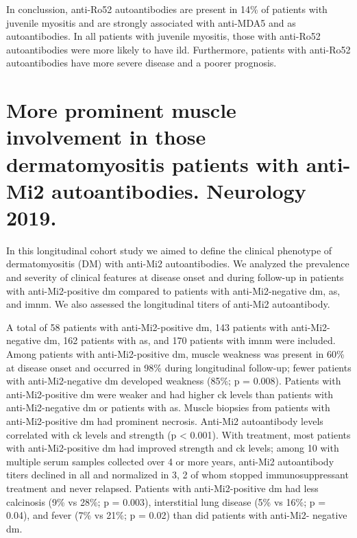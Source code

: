 In conclussion, anti-Ro52 autoantibodies are present in 14\% of patients with juvenile myositis and are strongly associated with anti-MDA5 and \gls{as} autoantibodies. In all patients with juvenile myositis, those with anti-Ro52 autoantibodies were more likely to have \gls{ild}. Furthermore, patients with anti-Ro52 autoantibodies have more severe disease and a poorer prognosis.



\section{More prominent muscle involvement in those dermatomyositis patients with anti-Mi2 autoantibodies. Neurology 2019.}
\label{sec:mi2_clinical}

In this longitudinal cohort study we aimed to define the clinical phenotype of dermatomyositis (DM) with anti-Mi2 autoantibodies. We analyzed the prevalence and severity of clinical features at disease onset and during follow-up in patients with anti-Mi2-positive \gls{dm} compared to patients with anti-Mi2-negative \gls{dm}, \gls{as}, and \gls{imnm}. We also assessed the longitudinal titers of anti-Mi2 autoantibody.

A total of 58 patients with anti-Mi2-positive \gls{dm}, 143 patients with anti-Mi2-negative \gls{dm}, 162 patients with \gls{as}, and 170 patients with \gls{imnm} were included. Among patients with anti-Mi2-positive \gls{dm}, muscle weakness was present in 60\% at disease onset and occurred in 98\% during longitudinal follow-up; fewer patients with anti-Mi2-negative \gls{dm} developed weakness (85\%; p = 0.008). Patients with anti-Mi2-positive \gls{dm} were weaker and had higher \gls{ck} levels than patients with anti-Mi2-negative \gls{dm} or patients with \gls{as}. Muscle biopsies from patients with anti-Mi2-positive \gls{dm} had prominent necrosis. Anti-Mi2 autoantibody levels correlated with \gls{ck} levels and strength (p < 0.001). With treatment, most patients with anti-Mi2-positive \gls{dm} had improved strength and \gls{ck} levels; among 10 with multiple serum samples collected over 4 or more years, anti-Mi2 autoantibody titers declined in all and normalized in 3, 2 of whom stopped immunosuppressant treatment and never relapsed. Patients with anti-Mi2-positive \gls{dm} had less calcinosis (9\% vs 28\%; p = 0.003), interstitial lung disease (5\% vs 16\%; p = 0.04), and fever (7\% vs 21\%; p = 0.02) than did patients with anti-Mi2- negative \gls{dm}.

